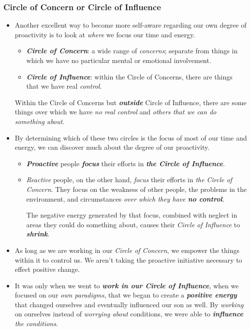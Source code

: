 \documentclass[11pt]{article}
\begin{document}
\subsubsection{Circle of Concern or Circle of Influence}
\begin{itemize}
\item Another excellent way to become more self-aware regarding our own degree of proactivity is to look at \emph{where} we focus our time and energy.
\begin{itemize}
\item \emph{\textbf{Circle of Concern}}: a wide range of \emph{concerns}; separate from things in which we have no particular mental or emotional involvement.

\item \emph{\textbf{Circle of Influence}}: within the Circle of Concerns, there are things that we have real \emph{control}.
\end{itemize}

Within the Circle of Concerns but \emph{\textbf{outside}} Circle of Influence, there are some things over which we have \emph{no real control} and \emph{others that we can do something about}. 

\item By determining which of these two circles is the focus of most of our time and energy, we can discover much about the degree of our proactivity.
\begin{itemize}
\item \emph{\textbf{Proactive}} people \emph{\textbf{focus}} their efforts in \emph{\textbf{the Circle of Influence}}. 
\item \emph{Reactive} people, on the other hand, \emph{focus} their efforts in \emph{the Circle of Concern}. They focus on the weakness of other people, the problems in the environment, and circumstances \emph{over which they have \textbf{no control}}. 

The negative energy generated by that focus, combined with neglect in areas they could do something about, causes their \emph{Circle of Influence} to \emph{\textbf{shrink}}.
\end{itemize}

\item As long as we are working in our \emph{Circle of Concern}, we empower the things within it to control us. We aren't taking the proactive initiative necessary to effect positive change.

\item It was only when we went to \emph{\textbf{work in our Circle of Influence}}, when we focused on our \emph{own paradigms}, that we began to create a \emph{\textbf{positive energy}} that changed ourselves and eventually influenced our son as well. By \emph{working} on ourselves instead of \emph{worrying about} conditions, we were able to
\emph{\textbf{influence} the conditions}.


\end{itemize}
\end{document}
